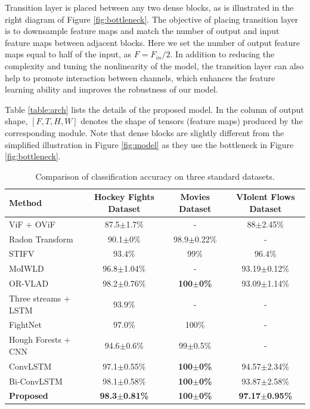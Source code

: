\documentclass[10pt,twocolumn,letterpaper]{article}
\begin{document}
Transition layer is placed between any two dense blocks, as is illustrated in the right diagram of Figure \ref{fig:bottleneck}.
The objective of placing transition layer is to downsample feature maps and match the number of output and input feature maps between adjacent blocks.
Here we set the number of output feature maps equal to half of the input, as $F = F_{in}/2$.
In addition to reducing the complexity and tuning the nonlinearity of the model, the transition layer can also help to promote interaction between channels, which enhances the feature learning ability and improves the robustness of our model.

Table \ref{table:arch} lists the details of the proposed model.
In the column of output shape, $[F, T, H, W]$ denotes the shape of tensors (feature maps) produced by the corresponding module.
Note that dense blocks are slightly different from the simplified illustration in Figure \ref{fig:model} as they use the bottleneck in Figure \ref{fig:bottleneck}. 






\begin{table}
\begin{center}
\caption{Comparison of classification accuracy on three standard datasets.}
\label{table:result}
\begin{tabular}{lccc}
\hline
\textbf{Method} & \textbf{Hockey Fights Dataset} & \textbf{Movies Dataset} & \textbf{VIolent Flows Dataset} \\
\hline\hline
ViF + OViF \cite{ovif} & 87.5$\pm$1.7\% & - & 88$\pm$2.45\% \\
Radon Transform \cite{fast} & 90.1$\pm$0\% & 98.9$\pm$0.22\% & - \\
STIFV \cite{bilinski2016human} & 93.4\% & 99\% & 96.4\% \\
MoIWLD \cite{MoIWLD} & 96.8$\pm$1.04\% & - & 93.19$\pm$0.12\% \\
OR-VLAD \cite{vlad} & 98.2$\pm$0.76\% & \textbf{100$\pm$0\%} & 93.09$\pm$1.14\% \\
\hline
Three streams + LSTM \cite{dong2016multi} & 93.9\% & - & - \\
FightNet \cite{zhou2017violent} & 97.0\% & 100\% & - \\
Hough Forests + CNN \cite{serrano2018fight} & 94.6$\pm$0.6\% & 99$\pm$0.5\% & - \\
ConvLSTM \cite{convlstm_sudh} & 97.1$\pm$0.55\% & \textbf{100$\pm$0\%} & 94.57$\pm$2.34\% \\
Bi-ConvLSTM \cite{bi_convlstm} & 98.1$\pm$0.58\% & \textbf{100$\pm$0\%} & 93.87$\pm$2.58\% \\
\textbf{Proposed} & \textbf{98.3$\pm$0.81\%} & \textbf{100$\pm$0\%} & \textbf{97.17$\pm$0.95\%} \\
\hline
\end{tabular}
\end{center}
\end{table}
\end{document}
